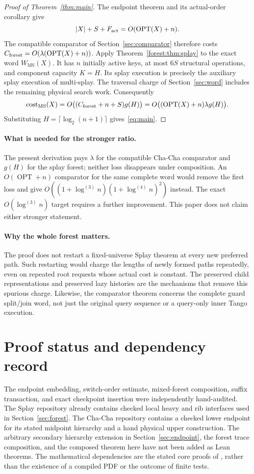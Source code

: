 \documentclass[11pt]{article}
\numberwithin{equation}{section}
\newcommand{\cost}{\operatorname{cost}}
\newcommand{\OPT}{\operatorname{OPT}}
\newcommand{\MS}{\mathrm{MS}}
\newcommand{\lgit}[1]{\log^{(#1)}}
\begin{document}
\begin{proof}[Proof of Theorem~\ref{thm:main}]
The endpoint theorem and its actual-order corollary give
\[
 |X|+S+F_{\rm act}=O(\OPT(X)+n).
\]
The compatible comparator of Section~\ref{sec:comparator} therefore
costs $C_{\rm forest}=O(\lambda(\OPT(X)+n))$. Apply
Theorem~\ref{forest:thm:splay} to the exact word
$W_{\MS}(X)$. It has $n$ initially active keys, at most $6S$
structural operations, and component capacity $K=H$. Its splay
execution is precisely the auxiliary splay execution of multi-splay.
The traversal charge of Section~\ref{sec:word} includes the remaining
physical search work. Consequently
\[
 \cost_{\MS}(X)
 =O\bigl((C_{\rm forest}+n+S)g(H)\bigr)
 =O\bigl((\OPT(X)+n)\lambda g(H)\bigr).
\]
Substituting $H=\lceil\log_2(n+1)\rceil$ gives~\eqref{eq:main}.
\end{proof}

\paragraph{What is needed for the stronger ratio.}
The present derivation pays $\lambda$ for the compatible Cha-Cha
comparator and $g(H)$ for the splay forest; neither loss disappears
under composition. An $O(\OPT+n)$ comparator for the same complete
word would remove the first loss and give
$O((1+\lgit{3}n)(1+\lgit{4}n)^2)$ instead. The exact
$O(\lgit{3}n)$ target requires a further improvement. This paper does
not claim either stronger statement.

\paragraph{Why the whole forest matters.}
The proof does not restart a fixed-universe Splay theorem at every
new preferred path. Such restarting would charge the lengths of newly
formed paths repeatedly, even on repeated root requests whose actual
cost is constant. The preserved child representations and preserved
lazy histories are the mechanisms that remove this spurious charge.
Likewise, the comparator theorem concerns the complete guard split/join
word, not just the original query sequence or a query-only inner Tango
execution.

\section{Proof status and dependency record}

The endpoint embedding, switch-order estimate, mixed-forest composition,
suffix transaction, and exact checkpoint insertion were independently
hand-audited. The Splay repository already contains checked local heavy
and rib interfaces used in Section~\ref{sec:forest}. The Cha-Cha
repository contains a checked lower endpoint for its stated midpoint
hierarchy and a hand physical upper construction. The arbitrary
secondary hierarchy extension in Section~\ref{sec:endpoint}, the forest
trace composition, and the composed theorem here have not been added
as Lean theorems. The mathematical dependencies are the stated core
proofs of \cite{Splay,ChaCha}, rather than the existence of a compiled
PDF or the outcome of finite tests.
\end{document}
